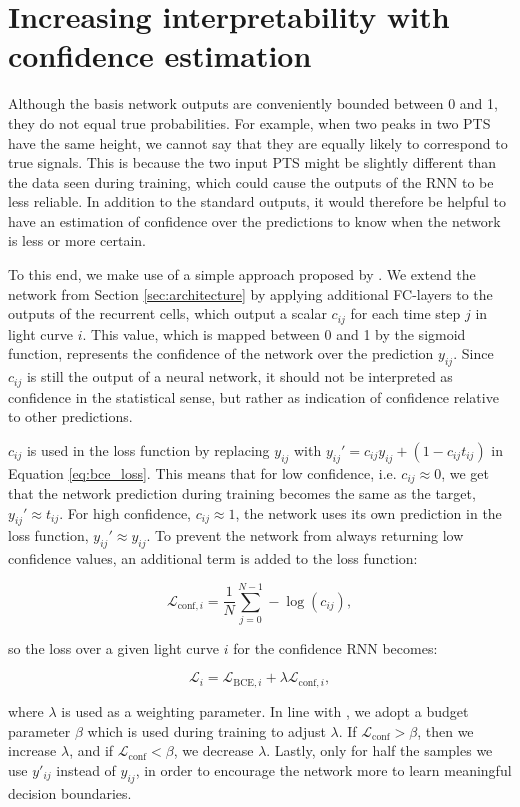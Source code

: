 
\section{Increasing interpretability with confidence estimation}
\label{sec:rnn_conf}

Although the basis network outputs are conveniently bounded between 0 and 1, they do not equal true probabilities. For example, when two peaks in two PTS have the same height, we cannot say that they are equally likely to correspond to true signals. This is because the two input PTS might be slightly different than the data seen during training, which could cause the outputs of the RNN to be less reliable. In addition to the standard outputs, it would therefore be helpful to have an estimation of confidence over the predictions to know when the network is less or more certain.

To this end, we make use of a simple approach proposed by \cite{devries2018learning}. We extend the network from Section \ref{sec:architecture} by applying additional FC-layers to the outputs of the recurrent cells, which output a scalar $c_{ij}$ for each time step $j$ in light curve $i$. This value, which is mapped between 0 and 1 by the sigmoid function, represents the confidence of the network over the prediction $y_{ij}$. Since $c_{ij}$ is still the output of a neural network, it should not be interpreted as confidence in the statistical sense, but rather as indication of confidence relative to other predictions. 

$c_{ij}$ is used in the loss function by replacing $y_{ij}$ with $y_{ij}' = c_{ij} y_{ij} +  (1-c_{ij} t_{ij})$ in Equation \ref{eq:bce_loss}. This means that for low confidence, i.e. $c_{ij} \approx 0$, we get that the network prediction during training becomes the same as the target, $y_{ij}' \approx t_{ij}$. For high confidence, $c_{ij} \approx 1$, the network uses its own prediction in the loss function, $y_{ij}' \approx y_{ij}$. To prevent the network from always returning low confidence values, an additional term is added to the loss function: 

\begin{equation}
    \mathcal{L}_{\text{conf},i} = 
    \frac{1}{N}\sum^{N-1}_{j=0} -\log(c_{ij}),
\end{equation}

\noindent so the loss over a given light curve $i$ for the confidence RNN becomes:

\begin{equation}
    \mathcal{L}_i = \mathcal{L}_{\text{BCE},i} + \lambda \mathcal{L}_{\text{conf},i},
\end{equation}

\noindent where $\lambda$ is used as a weighting parameter. In line with \cite{devries2018learning}, we adopt a budget parameter $\beta$ which is used during training to adjust $\lambda$. If $\mathcal{L}_{\text{conf}} > \beta$, then we increase $\lambda$, and if $\mathcal{L}_{\text{conf}} < \beta$, we decrease $\lambda$. Lastly, only for half the samples we use $y'_{ij}$ instead of $y_{ij}$, in order to encourage the network more to learn meaningful decision boundaries. 